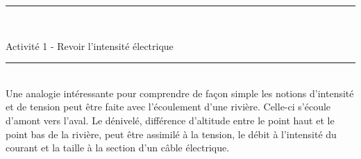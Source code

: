 \documentclass[11pt,a4paper]{article}
\begin{document}
\hrule\


\begin{center}
 \LARGE{Activité 1 - Revoir l'intensité  électrique}
\end{center}


\normalsize

\hrule\
\\[0,2cm]



Une analogie intéressante pour comprendre de façon simple les notions d'intensité et de tension peut être faite avec l'écoulement d'une rivière. Celle-ci s'écoule d'amont vers l'aval.  Le dénivelé, différence d'altitude entre le point haut et le point bas de la rivière, peut être assimilé à la tension, le débit à l'intensité du courant et la taille à la section d'un câble électrique.


\vspace{5mm}
\end{document}
